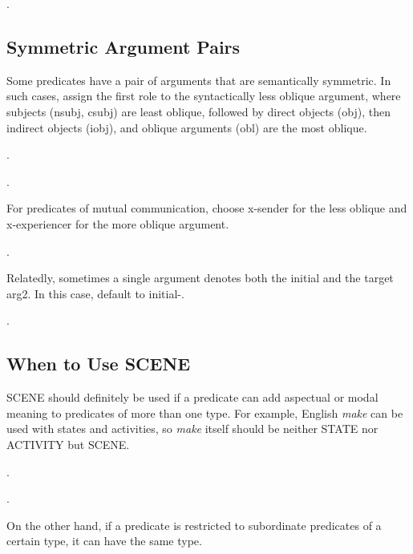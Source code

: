\documentclass[a4paper]{article}
\newcommand{\fr}[1]{\textsf{#1}}
\newcommand{\rl}[1]{\textsf{#1}}
\begin{document}
\ex.


\newpage\subsection{Symmetric Argument Pairs}

Some predicates have a pair of arguments that are semantically symmetric. In
such cases, assign the first role to the syntactically less oblique argument,
where subjects (\rl{nsubj}, \rl{csubj}) are least oblique, followed by direct
objects (\rl{obj}), then indirect objects (\rl{iobj}), and oblique arguments
(\rl{obl}) are the most oblique.

\ex.

\ex.

For predicates of mutual communication, choose \rl{x-sender} for the less
oblique and \rl{x-experiencer} for the more oblique argument.

\ex.

Relatedly, sometimes a single argument denotes both the initial and the target arg2. In this case, default to \fr{initial-}.

\ex.


\newpage\subsection{When to Use \fr{SCENE}}

\fr{SCENE} should definitely be used if a predicate can add aspectual or modal
meaning to predicates of more than one type. For example, English \emph{make}
can be used with states and activities, so \emph{make} itself should be neither
\fr{STATE} nor \fr{ACTIVITY} but \fr{SCENE}.

\ex.

\ex.

On the other hand, if a predicate is restricted to subordinate predicates of a
certain type, it can have the same type.
\end{document}
